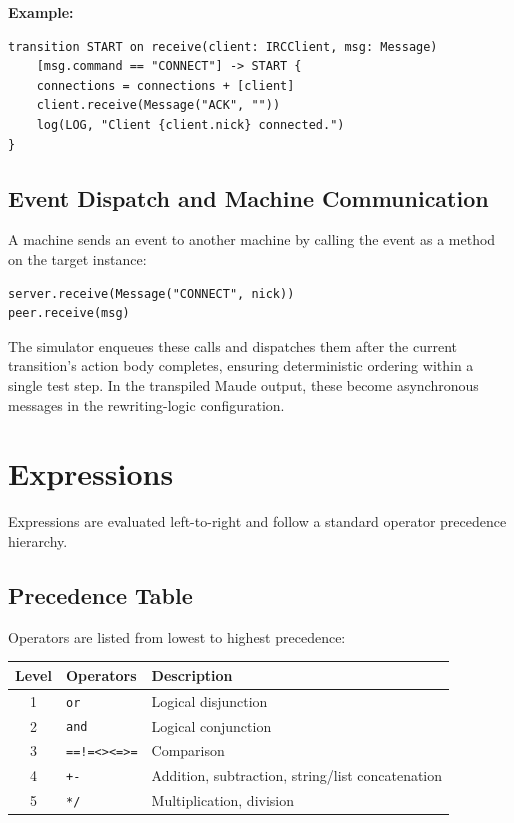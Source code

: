 \documentclass[11pt,letterpaper]{article}
\begin{document}
\textbf{Example:}
\begin{lstlisting}
transition START on receive(client: IRCClient, msg: Message)
    [msg.command == "CONNECT"] -> START {
    connections = connections + [client]
    client.receive(Message("ACK", ""))
    log(LOG, "Client {client.nick} connected.")
}
\end{lstlisting}

\subsection{Event Dispatch and Machine Communication}

A machine sends an event to another machine by calling the event as a
method on the target instance:

\begin{lstlisting}[numbers=none]
server.receive(Message("CONNECT", nick))
peer.receive(msg)
\end{lstlisting}

The simulator enqueues these calls and dispatches them after the current
transition's action body completes, ensuring deterministic ordering
within a single test step.  In the transpiled Maude output, these become
asynchronous messages in the rewriting-logic configuration.


\section{Expressions}
\label{sec:expressions}

Expressions are evaluated left-to-right and follow a standard operator
precedence hierarchy.

\subsection{Precedence Table}

Operators are listed from lowest to highest precedence:

\begin{center}
\begin{tabular}{@{}clp{6cm}@{}}
\toprule
\textbf{Level} & \textbf{Operators} & \textbf{Description} \\
\midrule
1 & \texttt{or}             & Logical disjunction \\
2 & \texttt{and}            & Logical conjunction \\
3 & \texttt{==\quad !=\quad <\quad >\quad <=\quad >=} & Comparison \\
4 & \texttt{+\quad -}       & Addition, subtraction, string/list concatenation \\
5 & \texttt{*\quad /}       & Multiplication, division \\
\bottomrule
\end{tabular}
\end{center}
\end{document}
